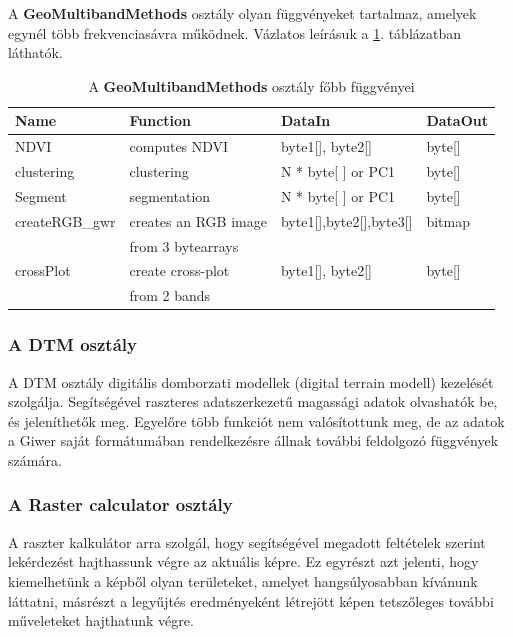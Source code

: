 \documentclass[a4paper,12pt]{article}
\begin{document}
A \textbf{GeoMultibandMethods} osztály olyan függvényeket tartalmaz, amelyek egynél több frekvenciasávra működnek.  Vázlatos leírásuk a \ref{fig:MultibandMethods}. táblázatban láthatók. 


\begin{table}
	\begin{small}	
		\begin{tabular}{|l|l|l|l|}
			\hline
			\textbf{Name} & \textbf{Function} & \textbf{DataIn} & \textbf{DataOut}\\	
			\hline
			NDVI & computes NDVI & byte1[], byte2[] & byte[] \\
			\hline
			clustering & clustering & N * byte[ ] or PC1 & byte[] \\
			\hline
			Segment & segmentation & N * byte[ ] or PC1 & byte[] \\
			\hline
			createRGB\_gwr & creates an RGB image & byte1[],byte2[],byte3[]& bitmap \\
			& from 3 bytearrays&&\\
			\hline
			crossPlot& create cross-plot& byte1[], byte2[] & byte[] \\
			& from 2 bands &&\\
			\hline
		\end{tabular}
	\end{small}
	\caption{A \textbf{GeoMultibandMethods} osztály főbb függvényei}
	\label{fig:MultibandMethods}
\end{table}

\subsubsection{A \textbf{DTM} osztály}

A DTM osztály digitális domborzati modellek (digital terrain modell) kezelését szolgálja. Segítségével raszteres adatszerkezetű magassági adatok olvashatók be, és jeleníthetők meg. Egyelőre több funkciót nem valósítottunk meg, de az adatok a Giwer saját formátumában rendelkezésre állnak további feldolgozó függvények számára.

\subsubsection{A \textbf{Raster calculator} osztály}

A raszter kalkulátor arra szolgál, hogy segítségével megadott feltételek szerint lekérdezést hajthassunk végre az aktuális képre. Ez egyrészt azt jelenti, hogy kiemelhetünk a képből olyan területeket, amelyet hangsúlyosabban kívánunk láttatni, másrészt a legyűjtés eredményeként létrejött képen tetszőleges további műveleteket hajthatunk végre.
\end{document}
